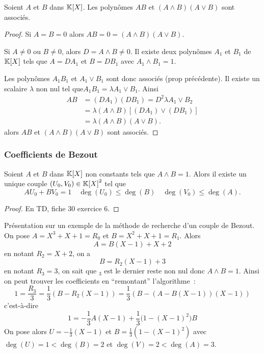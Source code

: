 \begin{prop}
  Soient \(A\) et \(B\) dans \(\mathbb{K}[X]\). Les polynômes \(AB\) et \((A\wedge B)(A 
  \vee B)\) sont associés.
\end{prop}
\begin{proof}
  Si \(A = B=0\) alors \(AB = 0=(A\wedge B)(A \vee B)\).

  Si \(A\neq 0\) ou \(B\neq 0\), alors \(D = A \wedge B \neq 0\). Il existe deux 
  polynômes \(A_1\) et \(B_1\) de \(\mathbb{K}[X]\) tels que \(A = DA_1\) et \(B = DB_1\) 
  avec \(A_1 \wedge B_1 =1\).

  Les polynômes \(A_1B_1\) et \(A_1 \vee B_1\) sont donc associés (prop 
  précédente). Il existe un scalaire \(\lambda\) non nul tel que\( A_1B_1= 
  \lambda A_1 \vee B_1\). Ainsi
  \begin{align}
    AB& = (DA_1)(DB_1) = D^2 \lambda A_1 \vee B_2 \\
    & = \lambda (A \wedge B) [(DA_1) \vee (DB_1)]\\
    & = \lambda (A \wedge B)(A \vee B).
  \end{align}
  alors \(AB\) et \((A\wedge B)(A \vee B)\) sont associés.
\end{proof}

\subsubsection{Coefficients de Bezout}

\begin{prop}
  Soient \(A\) et \(B\) dans \(\mathbb{K}[X]\) non constants tels que \(A\wedge B = 1\). 
  Alors il existe un unique couple \((U_0,V_0) \in {\mathbb{K}[X]}^2\) tel que
  \begin{equation}
    AU_0+BV_0 = 1 \quad \deg(U_0) \leqslant \deg(B) \quad \deg(V_0) \leqslant 
    \deg(A).
  \end{equation}
\end{prop}
\begin{proof}
  En TD, fiche 30 exercice 6.
\end{proof}

Présentation sur un exemple de la méthode de recherche d'un couple de Bezout. On 
pose \(A = X^3+X+1 = R_0\) et \(B = X^2+X+1 = R_1\). Alors
\begin{equation}
  A = B(X-1)+X+2
\end{equation}
en notant \(R_2 = X+2\), on a
\begin{equation}
  B = R_2(X-1)+3
\end{equation}
en notant \(R_3 = 3\), on sait que \(_3\) est le dernier reste non nul donc 
\(A\wedge B = 1\). Ainsi on peut trouver les coefficients en ``remontant'' 
l'algorithme~:
\begin{equation}
  1 = \frac{R_3}{3} = \frac{1}{3}(B-R_2(X-1)) = \frac{1}{3}(B-(A-B(X-1))(X-1))
\end{equation}
c'est-à-dire
\begin{equation}
  1 = -\frac{1}{3} A(X-1) + \frac{1}{3}{(1-(X-1)}^2)B
\end{equation}
On pose alors \(U = -\frac{1}{3}(X-1)\) et \(B = \frac{1}{3}(1-(X-1)^2)\) avec 
\(\deg(U) = 1 < \deg(B) = 2\) et \(\deg(V) = 2 < \deg(A) = 3\).

